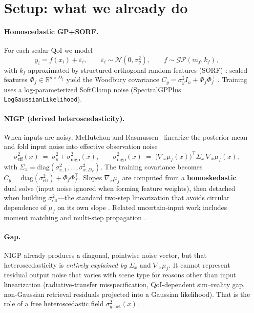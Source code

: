 \documentclass[11pt]{article}
\newcommand{\sigy}{\sigma_{y}^{2}}%
\newcommand{\sighet}{\sigma_{y,\mathrm{het}}^{2}}%
\newcommand{\signigp}{\sigma_{\mathrm{nigp}}^{2}}%
\newcommand{\sigeff}{\sigma_{\mathrm{eff}}^{2}}%
\newcommand{\Sigx}{\Sigma_{x}}%
\newcommand{\Phif}{\Phi_{f}}%
\newcommand{\gradmuf}{\nabla_{x}\mu_{f}}%
\newcommand{\Cy}{C_{y}}%
\begin{document}
\section{Setup: what we already do}

\paragraph{Homoscedastic GP+SORF.}
For each scalar QoI we model
\begin{equation}
\label{eq:homo}
  y_i = f(x_i)+\varepsilon_i,\qquad
  \varepsilon_i\sim\mathcal N(0,\sigy),\qquad
  f\sim\mathcal{GP}(m_f,k_f),
\end{equation}
with $k_f$ approximated by structured orthogonal random features (SORF)
\cite{rahimi2007rff,yu2016orf}: scaled features $\Phif\in\mathbb{R}^{n\times D_f}$
yield the Woodbury covariance
$\Cy=\sigy I_n+\Phif\Phif^{\top}$
\cite{cutajar2017dgp,rasmussen2006gpml,yousefpour2024gpplus}.
Training uses a log-parameterized SoftClamp noise (SpectralGPPlus
\texttt{LogGaussianLikelihood}).

\paragraph{NIGP (derived heteroscedasticity).}
When inputs are noisy, McHutchon and Rasmussen~\cite{mchutchon2011nigp}
linearize the posterior mean and fold input noise into effective observation noise
\begin{equation}
\label{eq:nigp-d}
  \sigeff(x)
  \;=\;
  \sigy
  +
  \signigp(x),
  \qquad
  \signigp(x)
  \;=\;
  \bigl(\gradmuf(x)\bigr)^{\!\top}
  \Sigx\,
  \gradmuf(x),
\end{equation}
with $\Sigx=\mathrm{diag}(\sigma_{x,1}^{2},\ldots,\sigma_{x,D_x}^{2})$.
The training covariance becomes $\Cy=\mathrm{diag}(\sigeff)+\Phif\Phif^{\top}$.
Slopes $\gradmuf$ are computed from a \textbf{homoskedastic} dual solve
(input noise ignored when forming feature weights), then detached when building
$\sigeff$---the standard two-step linearization that avoids circular dependence of
$\mu_f$ on its own slope \cite{mchutchon2011nigp}.
Related uncertain-input work includes moment matching and multi-step propagation
\cite{girard2003uncertain,quinonero2003propagation,dallaire2009uncertain}.

\paragraph{Gap.}
NIGP already produces a diagonal, pointwise noise vector, but that heteroscedasticity is
\emph{entirely explained by} $\Sigx$ and $\gradmuf$.
It cannot represent residual output noise that varies with scene type for reasons other
than input linearization (radiative-transfer misspecification, QoI-dependent sim--reality gap,
non-Gaussian retrieval residuals projected into a Gaussian likelihood).
That is the role of a free heteroscedastic field $\sighet(x)$.
\end{document}
